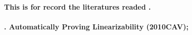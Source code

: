 \documentclass{article}
\begin{document}
\noindent
\bfseries{This is for record the literatures readed .}\\\\
. Automatically Proving Linearizability (2010CAV);\\
\end{document}
